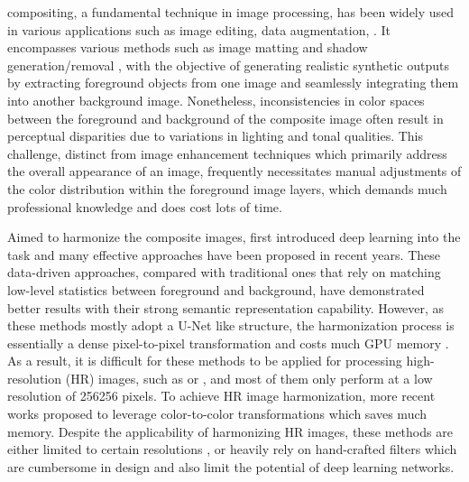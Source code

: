 \documentclass[10pt,journal,twocolumn,twoside]{IEEEtran}
\begin{document}
 compositing, a fundamental technique in image processing, has been widely used in various applications such as image editing\cite{10.1145/1201775.882269, barnes2009patchmatch, kwatra2003graphcut}, data augmentation\cite{yun2019cutmix, zhang2020learning, wang2020constrained}, \etc. It encompasses various methods such as image matting \cite{wang2023composited} and shadow generation/removal \cite{inoue2020learning}, with the objective of generating realistic synthetic outputs by extracting foreground objects from one image and seamlessly integrating them into another background image. Nonetheless, inconsistencies in color spaces between the foreground and background of the composite image often result in perceptual disparities due to variations in lighting and tonal qualities. This challenge, distinct from image enhancement techniques \cite{ren2018lecarm, zhao2021retinexdip} which primarily address the overall appearance of an image, frequently necessitates manual adjustments of the color distribution within the foreground image layers, which demands much professional knowledge and does cost lots of time.

Aimed to harmonize the composite images, \cite{tsai2017deep} first introduced deep learning into the task and many effective approaches have been proposed \cite{cong2020dovenet, guo2021image, ling2021region, guo2021intrinsic, sofiiuk2021foreground, hang2022scs} in recent years. These data-driven approaches, compared with traditional ones \cite{lalonde2007using, xue2012understanding, reinhard2001color, pitie2005n} that rely on matching low-level statistics between foreground and background, have demonstrated better results with their strong semantic representation capability. However, as these methods mostly adopt a U-Net \cite{ronneberger2015u} like structure, the harmonization process is essentially a dense pixel-to-pixel transformation and costs much GPU memory \cite{cong2022high}. As a result, it is difficult for these methods to be applied for processing high-resolution (HR) images, such as  or , and most of them only perform at a low resolution of 256256 pixels. To achieve HR image harmonization, more recent works \cite{cong2022high, ke2022harmonizer, xue2022dccf} proposed to leverage color-to-color transformations which saves much memory. Despite the applicability of harmonizing HR images, these methods are either limited to certain resolutions \cite{cong2022high}, or heavily rely on hand-crafted filters \cite{ke2022harmonizer, xue2022dccf} which are cumbersome in design and also limit the potential of deep learning networks.
\end{document}
